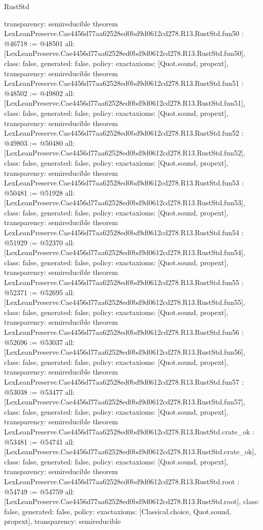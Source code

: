 \begin{lexlean}{RustStd}
\begin{coremodule}
{  transparency: semireducible
}
theorem LexLeanPreserve.Cae4456d77aa62528ed0bd9d0612cd278.R13.RustStd.fun50 : @46718 := @48501 {
  all: [LexLeanPreserve.Cae4456d77aa62528ed0bd9d0612cd278.R13.RustStd.fun50],
  class: false,
  generated: false,
  policy: exact{axioms: [Quot.sound, propext]},
  transparency: semireducible
}
theorem LexLeanPreserve.Cae4456d77aa62528ed0bd9d0612cd278.R13.RustStd.fun51 : @48502 := @49802 {
  all: [LexLeanPreserve.Cae4456d77aa62528ed0bd9d0612cd278.R13.RustStd.fun51],
  class: false,
  generated: false,
  policy: exact{axioms: [Quot.sound, propext]},
  transparency: semireducible
}
theorem LexLeanPreserve.Cae4456d77aa62528ed0bd9d0612cd278.R13.RustStd.fun52 : @49803 := @50480 {
  all: [LexLeanPreserve.Cae4456d77aa62528ed0bd9d0612cd278.R13.RustStd.fun52],
  class: false,
  generated: false,
  policy: exact{axioms: [Quot.sound, propext]},
  transparency: semireducible
}
theorem LexLeanPreserve.Cae4456d77aa62528ed0bd9d0612cd278.R13.RustStd.fun53 : @50481 := @51928 {
  all: [LexLeanPreserve.Cae4456d77aa62528ed0bd9d0612cd278.R13.RustStd.fun53],
  class: false,
  generated: false,
  policy: exact{axioms: [Quot.sound, propext]},
  transparency: semireducible
}
theorem LexLeanPreserve.Cae4456d77aa62528ed0bd9d0612cd278.R13.RustStd.fun54 : @51929 := @52370 {
  all: [LexLeanPreserve.Cae4456d77aa62528ed0bd9d0612cd278.R13.RustStd.fun54],
  class: false,
  generated: false,
  policy: exact{axioms: [Quot.sound, propext]},
  transparency: semireducible
}
theorem LexLeanPreserve.Cae4456d77aa62528ed0bd9d0612cd278.R13.RustStd.fun55 : @52371 := @52695 {
  all: [LexLeanPreserve.Cae4456d77aa62528ed0bd9d0612cd278.R13.RustStd.fun55],
  class: false,
  generated: false,
  policy: exact{axioms: [Quot.sound, propext]},
  transparency: semireducible
}
theorem LexLeanPreserve.Cae4456d77aa62528ed0bd9d0612cd278.R13.RustStd.fun56 : @52696 := @53037 {
  all: [LexLeanPreserve.Cae4456d77aa62528ed0bd9d0612cd278.R13.RustStd.fun56],
  class: false,
  generated: false,
  policy: exact{axioms: [Quot.sound, propext]},
  transparency: semireducible
}
theorem LexLeanPreserve.Cae4456d77aa62528ed0bd9d0612cd278.R13.RustStd.fun57 : @53038 := @53477 {
  all: [LexLeanPreserve.Cae4456d77aa62528ed0bd9d0612cd278.R13.RustStd.fun57],
  class: false,
  generated: false,
  policy: exact{axioms: [Quot.sound, propext]},
  transparency: semireducible
}
theorem LexLeanPreserve.Cae4456d77aa62528ed0bd9d0612cd278.R13.RustStd.crate_ok : @53481 := @54741 {
  all: [LexLeanPreserve.Cae4456d77aa62528ed0bd9d0612cd278.R13.RustStd.crate_ok],
  class: false,
  generated: false,
  policy: exact{axioms: [Quot.sound, propext]},
  transparency: semireducible
}
theorem LexLeanPreserve.Cae4456d77aa62528ed0bd9d0612cd278.R13.RustStd.root : @54749 := @54759 {
  all: [LexLeanPreserve.Cae4456d77aa62528ed0bd9d0612cd278.R13.RustStd.root],
  class: false,
  generated: false,
  policy: exact{axioms: [Classical.choice, Quot.sound, propext]},
  transparency: semireducible
}


\end{coremodule}
\end{lexlean}
